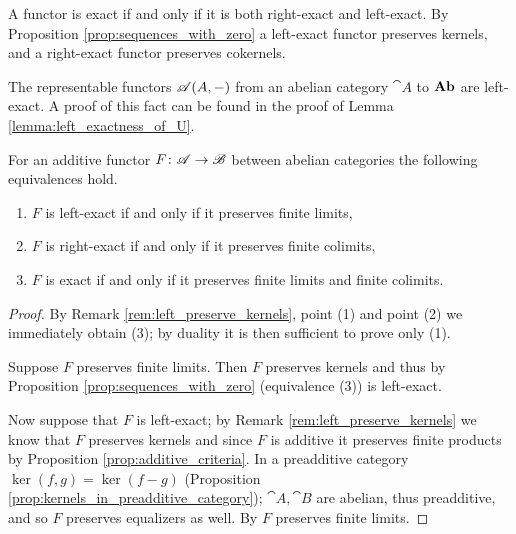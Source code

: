 \begin{remark}
  \label{rem:left_preserve_kernels}
  A functor is exact if and only if it is both right-exact and left-exact. By Proposition \ref{prop:sequences_with_zero} a left-exact functor preserves kernels, and a right-exact functor preserves cokernels.
\end{remark}

\begin{example}
  \label{ex:exact_example}
  The representable functors \({\mathscr A}(A,-)\) from an abelian category \(\cat{A}\) to \(\text{\normalfont\textbf{Ab}}\) are left-exact. A proof of this fact can be found in the proof of Lemma \ref{lemma:left_exactness_of_U}.
\end{example}

\begin{proposition}
  \label{prop:characterization_of_exact_functors}
  For an additive functor \(F\colon {\mathscr A}\to {\mathscr B}\) between abelian categories the following equivalences hold.
  \begin{enumerate}[label=(\arabic*)]
  \item \(F\) is left-exact if and only if it preserves finite limits,
  \item \(F\) is right-exact if and only if it preserves finite colimits,
  \item \(F\) is exact if and only if it preserves finite limits and finite colimits.
  \end{enumerate}
\end{proposition}

\begin{proof}
  By Remark \ref{rem:left_preserve_kernels}, point (1) and point (2)  we immediately obtain (3); by duality it is then sufficient to prove only (1).

  Suppose \(F\) preserves finite limits. Then \(F\) preserves kernels and thus by Proposition \ref{prop:sequences_with_zero} (equivalence (3)) is left-exact.

  Now suppose that \(F\) is left-exact; by Remark \ref{rem:left_preserve_kernels} we know that \(F\) preserves kernels and since \(F\) is additive it preserves finite products by Proposition \ref{prop:additive_criteria}. In a preadditive category \(\ker(f, g) = \ker(f - g)\) (Proposition \ref{prop:kernels_in_preadditive_category}); \(\cat{A}, \cat{B}\) are abelian, thus preadditive, and so \(F\) preserves equalizers as well. By \cite[2.9.2]{handbook1} \(F\) preserves finite limits.
\end{proof}

